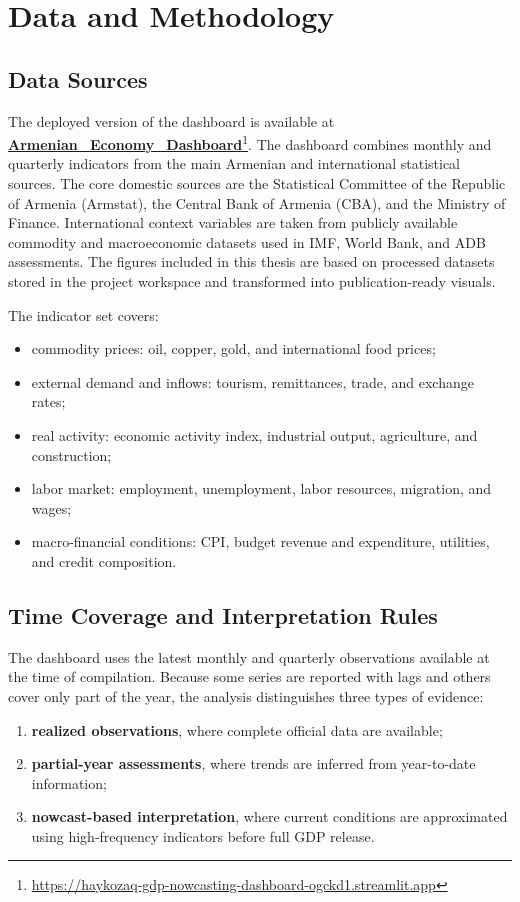 \documentclass[12pt,a4paper]{report}
\begin{document}
\chapter{Data and Methodology}
\section{Data Sources}
The deployed version of the dashboard is available at \href{https://haykozaq-gdp-nowcasting-dashboard-ogckd1.streamlit.app/}{\textbf{Armenian\_Economy\_Dashboard}}\footnote{\url{https://haykozaq-gdp-nowcasting-dashboard-ogckd1.streamlit.app}}. The dashboard combines monthly and quarterly indicators from the main Armenian and international statistical sources. The core domestic sources are the Statistical Committee of the Republic of Armenia (Armstat), the Central Bank of Armenia (CBA), and the Ministry of Finance. International context variables are taken from publicly available commodity and macroeconomic datasets used in IMF, World Bank, and ADB assessments. The figures included in this thesis are based on processed datasets stored in the project workspace and transformed into publication-ready visuals.\cite{armstatbank,cbaMPR2025Q1,minfinBudget,imfCR24348,wbMEU2025,adbADO2024}

The indicator set covers:
\begin{itemize}
    \item commodity prices: oil, copper, gold, and international food prices;
    \item external demand and inflows: tourism, remittances, trade, and exchange rates;
    \item real activity: economic activity index, industrial output, agriculture, and construction;
    \item labor market: employment, unemployment, labor resources, migration, and wages;
    \item macro-financial conditions: CPI, budget revenue and expenditure, utilities, and credit composition.
\end{itemize}

\section{Time Coverage and Interpretation Rules}
The dashboard uses the latest monthly and quarterly observations available at the time of compilation. Because some series are reported with lags and others cover only part of the year, the analysis distinguishes three types of evidence:
\begin{enumerate}
    \item \textbf{realized observations}, where complete official data are available;
    \item \textbf{partial-year assessments}, where trends are inferred from year-to-date information;
    \item \textbf{nowcast-based interpretation}, where current conditions are approximated using high-frequency indicators before full GDP release.
\end{enumerate}
\end{document}
